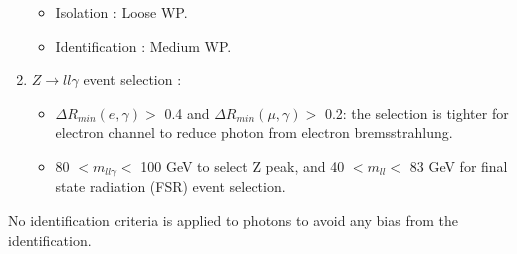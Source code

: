 \begin{enumerate}
\begin{itemize}
        \item Isolation : Loose WP.
        \item Identification : Medium WP.
    \end{itemize}
    \item $Z \rightarrow ll\gamma$ event selection :
    \begin{itemize}
        \item $\Delta R_{min}(e,\gamma) > $ 0.4 and $\Delta R_{min}(\mu,\gamma) > $ 0.2: the selection is tighter for electron channel to reduce photon from electron bremsstrahlung.
        \item 80 $ < m_{ll\gamma} < $ 100 GeV to select Z peak,  and 40 $ < m_{ll} < $ 83 GeV for final state radiation (FSR) event selection. 
    \end{itemize}
\end{enumerate}
No identification criteria is applied to photons to avoid any bias from the identification.

